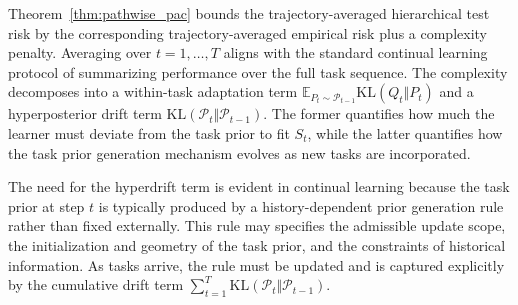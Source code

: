 \documentclass{article}
\theoremstyle{plain}
\theoremstyle{definition}
\theoremstyle{remark}
\begin{document}
Theorem~\ref{thm:pathwise_pac} bounds the trajectory-averaged hierarchical test risk by the corresponding trajectory-averaged empirical risk plus a complexity penalty.
Averaging over $t=1,\dots,T$ aligns with the standard continual learning protocol of summarizing performance over the full task sequence.
The complexity decomposes into a within-task adaptation term $\mathbb E_{P_t\sim\mathcal P_{t-1}}\mathrm{KL}(Q_t\Vert P_t)$ and a hyperposterior drift term $\mathrm{KL}(\mathcal P_t\Vert\mathcal P_{t-1})$.
The former quantifies how much the learner must deviate from the task prior to fit $S_t$, while the latter quantifies how the task prior generation mechanism evolves as new tasks are incorporated. 


The need for the hyperdrift term is evident in continual learning because the task prior at step $t$ is typically produced by a history-dependent prior generation rule rather than fixed externally. 
This rule may specifies the admissible update scope\cite{progressive2016,HAT2018,Piggyback2018,Supermasks2020,adapter2019,hu2022lora}, the initialization and geometry of the task prior\cite{EWC2017}, and the constraints of historical information\cite{farajtabarOrthogonalGradientDescent2020,SI2017}.
As tasks arrive, the rule must be updated and is captured explicitly by the cumulative drift term $\sum_{t=1}^T \mathrm{KL}(\mathcal P_t\Vert\mathcal P_{t-1})$.

\end{document}

